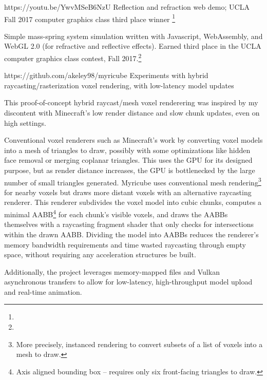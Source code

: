\ifdefined\CV
{}
\fi

%
{https://youtu.be/YwvMSeB6NzU}%
{Reflection and refraction web demo;
UCLA Fall 2017 computer graphics class third place winner%
\footnote{}}
\ifdefined\CV

Simple mass-spring system simulation written with Javascript,
WebAssembly, and WebGL 2.0 (for refractive and reflective effects).
Earned third place in the UCLA computer graphics class contest, Fall
2017.\footnote{
  }

\hfill{}
\fi
\filbreak

%
{https://github.com/akeley98/myricube}%
{Experiments with hybrid raycasting/rasterization voxel rendering,
with low-latency model updates}
\ifdefined\CV

This proof-of-concept hybrid raycast/mesh voxel renderering was
inspired by my discontent with Minecraft's low render distance and
slow chunk updates, even on high settings.

Conventional voxel renderers such as Minecraft's work by converting
voxel models into a mesh of triangles to draw, possibly with some
optimizations like hidden face removal or merging coplanar
triangles. This uses the GPU for its designed purpose, but as render
distance increases, the GPU is bottlenecked by the large number of
small triangles generated. Myricube uses conventional mesh
rendering\footnote{More precisely, instanced rendering to convert
subsets of a list of voxels into a mesh to draw.} for nearby voxels
but draws more distant voxels with an alternative raycasting
renderer. This renderer subdivides the voxel model into cubic chunks,
computes a minimal AABB\footnote{Axis aligned bounding box -- requires
only six front-facing triangles to draw.} for each chunk's visible
voxels, and draws the AABBs themselves with a raycasting fragment
shader that only checks for intersections within the drawn AABB.
Dividing the model into AABBs reduces the renderer's memory bandwidth
requirements and time wasted raycasting through empty space, without
requiring any acceleration structures be built.

Additionally, the project leverages memory-mapped files and Vulkan
asynchronous transfers to allow for low-latency, high-throughput model
upload and real-time animation.

